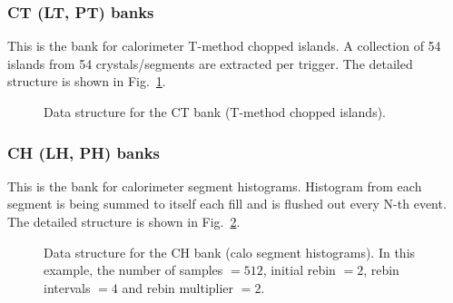 \subsubsection*{CT (LT, PT) banks}

This is the bank for calorimeter T-method chopped islands. A collection of 54 islands from 54 crystals/segments are extracted per trigger. The detailed structure is shown in Fig.~\ref{fig:CTBankFormat}.

\begin{figure}[htbp]
\centering
{}
\caption{Data structure for the CT bank (T-method chopped islands).}\label{fig:CTBankFormat}
\end{figure}

\subsubsection*{CH (LH, PH) banks}

This is the bank for calorimeter segment histograms. Histogram from each segment is being summed to itself each fill and is flushed out every N-th event. The detailed structure is shown in Fig.~\ref{fig:CHBankFormat}.

\begin{figure}[htbp]
\centering
{}
\caption{Data structure for the CH bank (calo segment histograms). In this example, the number of samples $= 512$, initial rebin $= 2$, rebin intervals $=4$ and rebin multiplier $=2$.}\label{fig:CHBankFormat}
\end{figure}

